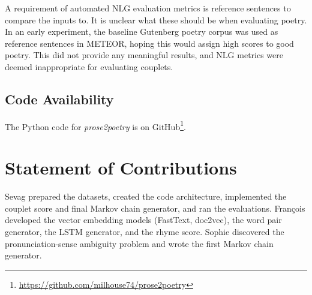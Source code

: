 \documentclass[11pt,a4paper]{article}
\begin{document}
A requirement of automated NLG evaluation metrics is reference sentences to compare the inputs to. It is unclear what these should be when evaluating poetry. In an early experiment, the baseline Gutenberg poetry corpus was used as reference sentences in METEOR, hoping this would assign high scores to good poetry. This did not provide any meaningful results, and NLG metrics were deemed inappropriate for evaluating couplets.

\subsection{Code Availability}

The Python code for \textit{prose2poetry} is on GitHub\footnote{\href{https://github.com/milhouse74/prose2poetry}{https://github.com/milhouse74/prose2poetry}}.

\section{Statement of Contributions}
\label{sec:contributions}
Sevag prepared the datasets, created the code architecture, implemented the couplet score and final Markov chain generator, and ran the evaluations. François developed the vector embedding models (FastText, doc2vec), the word pair generator, the LSTM generator, and the rhyme score. Sophie discovered the pronunciation-sense ambiguity problem and wrote the first Markov chain generator.

\vfill
\clearpage %



\end{document}
